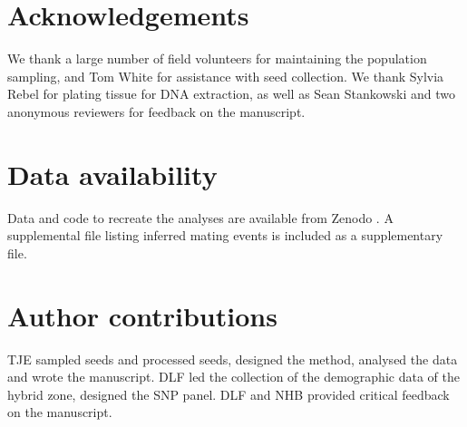 \documentclass[10pt, a4paper, twocolumn]{article} %
\begin{document}
\section{Acknowledgements}

We thank a large number of field volunteers for maintaining the population sampling, and Tom White for assistance with seed collection. We thank Sylvia Rebel for plating tissue for DNA extraction, as well as Sean Stankowski and two anonymous reviewers for feedback on the manuscript.

\section{Data availability}

Data and code to recreate the analyses are available from Zenodo \citep{tom_ellis_2024_10565078}. A supplemental file listing inferred mating events is included as a supplementary file.

\section{Author contributions}

TJE sampled seeds and processed seeds, designed the method, analysed the data and wrote the manuscript.
DLF led the collection of the demographic data of the hybrid zone, designed the SNP panel.
DLF and NHB provided critical feedback on the manuscript. 

\printbibliography[title={Bibliography}] %
% 
\end{document}

